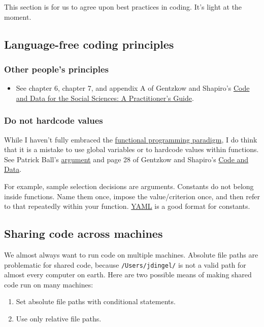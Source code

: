 This section is for us to agree upon best practices in coding.
It's light at the moment.

\subsection{Language-free coding principles}

\subsubsection{Other people's principles}

\begin{itemize}
	\item See chapter 6, chapter 7, and appendix A of Gentzkow and Shapiro's \href{https://web.stanford.edu/~gentzkow/research/CodeAndData.pdf}{Code and Data for the Social Sciences: A Practitioner’s Guide}.
\end{itemize}

\subsubsection{Do not hardcode values}

While I haven't fully embraced the \href{https://en.wikipedia.org/wiki/Functional_programming}{functional programming paradigm},
I do think that it is a mistake to use global variables or to hardcode values within functions.
See 
Patrick Ball's \href{https://www.youtube.com/watch?v=ZSunU9GQdcI&t=36m43s}{argument} 
and
page 28 of Gentzkow and Shapiro's \href{https://web.stanford.edu/~gentzkow/research/CodeAndData.pdf}{Code and Data}.

For example, sample selection decisions are arguments.
Constants do not belong inside functions.
Name them once, impose the value/criterion once, and then refer to that repeatedly within your function.
\href{http://yaml.org/}{YAML} is a good format for constants.

\subsection{Sharing code across machines}

We almost always want to run code on multiple machines.
Absolute file paths are problematic for shared code, because \texttt{/Users/jdingel/} is not a valid path for almost every computer on earth.
Here are two possible means of making shared code run on many machines: 
\begin{enumerate}
	\item Set absolute file paths with conditional statements.
	\item Use only relative file paths.
\end{enumerate}

